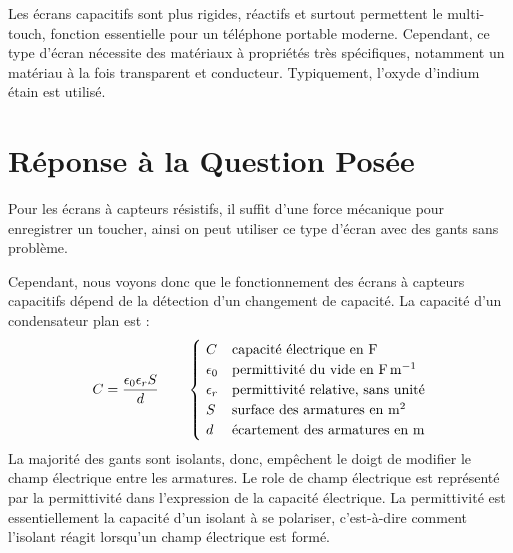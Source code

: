 \documentclass[DIV=12]{scrartcl}
\begin{document}
\begin{itemize}
        Les écrans capacitifs sont plus rigides, réactifs et surtout permettent le multi-touch, fonction essentielle pour un téléphone portable moderne. Cependant, ce type d'écran nécessite des matériaux à propriétés très spécifiques, notamment un matériau à la fois transparent et conducteur. Typiquement, l'oxyde d'indium étain est utilisé.
   \end{itemize}
   \section{Réponse à la Question Posée}
   Pour les écrans à capteurs résistifs, il suffit d'une force mécanique pour enregistrer un toucher, ainsi on peut utiliser ce type d'écran avec des gants sans problème.

   Cependant, nous voyons donc que le fonctionnement des écrans à capteurs capacitifs dépend de la détection d'un changement de capacité. La capacité d'un condensateur plan est :
   \[C=\frac{\epsilon_0\epsilon_r S}{d}\qquad\begin{cases}~C&\text{capacité électrique en \si{\farad}}\\~\epsilon_0&\text{permittivité du vide en $\si{\farad\per\meter}$}\\~\epsilon_r&\text{permittivité relative, sans unité}\\~S&\text{surface des armatures en \si{\metre\squared}}\\~d&\text{écartement des armatures en $\si{m}$}\end{cases}\]
   La majorité des gants sont isolants, donc, empêchent le doigt de modifier le champ électrique entre les armatures. Le role de champ électrique est représenté par la permittivité dans l'expression de la capacité électrique. La permittivité est essentiellement la capacité d'un isolant à se polariser, c'est-à-dire comment l'isolant réagit lorsqu'un champ électrique est formé.
\end{document}
